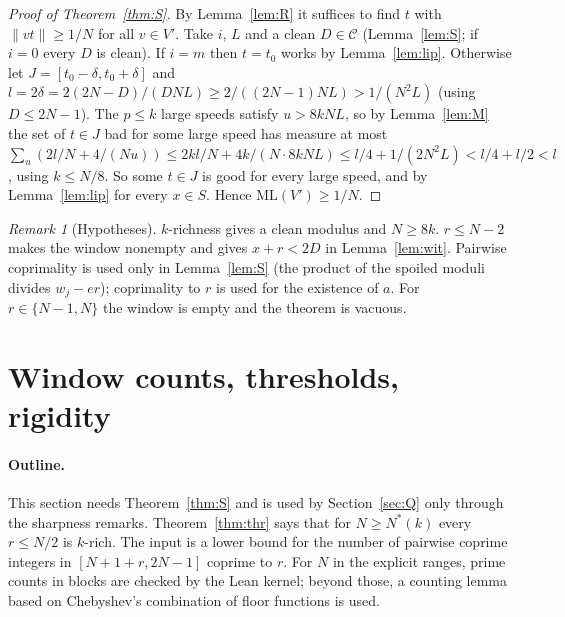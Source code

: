 \documentclass[11pt]{article}
\theoremstyle{definition}
\theoremstyle{remark}
\newtheorem{remark}[theorem]{Remark}
\newcommand{\nd}[1]{\lVert #1\rVert}
\newcommand{\ML}{\mathrm{ML}}
\begin{document}
\begin{proof}[Proof of Theorem~\ref{thm:S}]
By Lemma~\ref{lem:R} it suffices to find $t$ with $\nd{vt}\ge1/N$ for all $v\in V'$. Take $i$, $L$ and a clean $D\in\mathcal C$ (Lemma~\ref{lem:S}; if $i=0$ every $D$ is clean). If $i=m$ then $t=t_0$ works by Lemma~\ref{lem:lip}. Otherwise let $J=[t_0-\delta,t_0+\delta]$ and $l=2\delta=2(2N-D)/(DNL)\ge2/((2N-1)NL)>1/(N^2L)$ (using $D\le2N-1$). The $p\le k$ large speeds satisfy $u>8kNL$, so by Lemma~\ref{lem:M} the set of $t\in J$ bad for some large speed has measure at most $\sum_u(2l/N+4/(Nu))\le2kl/N+4k/(N\cdot8kNL)\le l/4+1/(2N^2L)<l/4+l/2<l$, using $k\le N/8$. So some $t\in J$ is good for every large speed, and by Lemma~\ref{lem:lip} for every $x\in S$. Hence $\ML(V')\ge1/N$.
\end{proof}

\begin{remark}[Hypotheses]
$k$-richness gives a clean modulus and $N\ge8k$. $r\le N-2$ makes the window nonempty and gives $x+r<2D$ in Lemma~\ref{lem:wit}. Pairwise coprimality is used only in Lemma~\ref{lem:S} (the product of the spoiled moduli divides $w_j-er$); coprimality to $r$ is used for the existence of $a$. For $r\in\{N-1,N\}$ the window is empty and the theorem is vacuous.
\end{remark}


\section{Window counts, thresholds, rigidity}\label{sec:thr}

\paragraph{Outline.}
This section needs Theorem~\ref{thm:S} and is used by Section~\ref{sec:Q} only through the sharpness remarks. Theorem~\ref{thm:thr} says that for $N\ge N^*(k)$ every $r\le N/2$ is $k$-rich. The input is a lower bound for the number of pairwise coprime integers in $[N+1+r,2N-1]$ coprime to $r$. For $N$ in the explicit ranges, prime counts in blocks are checked by the Lean kernel; beyond those, a counting lemma based on Chebyshev's combination of floor functions is used.
\end{document}

